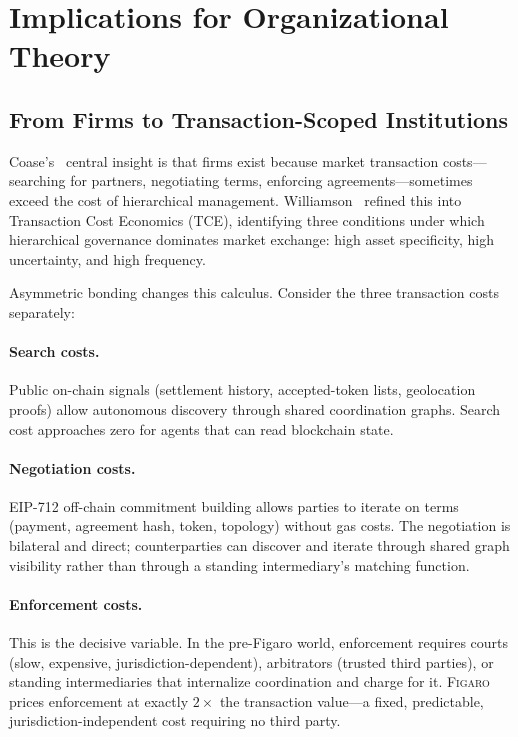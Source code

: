 \documentclass[11pt,a4paper]{article}
\theoremstyle{definition}
\theoremstyle{remark}
\newcommand{\figaro}{\textsc{Figaro}}
\begin{document}
\section{Implications for Organizational Theory}
\label{sec:post-firm}

\subsection{From Firms to Transaction-Scoped Institutions}

Coase's~\citeyearpar{coase1937} central insight is that firms exist
because market transaction costs---searching for partners, negotiating
terms, enforcing agreements---sometimes exceed the cost of hierarchical
management. Williamson~\citeyearpar{williamson1985} refined this into
Transaction Cost Economics (TCE), identifying three conditions under
which hierarchical governance dominates market exchange: high asset
specificity, high uncertainty, and high frequency.

Asymmetric bonding changes this calculus. Consider the three transaction
costs separately:

\paragraph{Search costs.}
Public on-chain signals (settlement history, accepted-token lists,
geolocation proofs) allow autonomous discovery through shared
coordination graphs. Search cost approaches zero for agents that can
read blockchain state.

\paragraph{Negotiation costs.}
EIP-712 off-chain commitment building allows parties to iterate on terms
(payment, agreement hash, token, topology) without gas costs. The
negotiation is bilateral and direct; counterparties can discover and
iterate through shared graph visibility rather than through a standing
intermediary's matching function.

\paragraph{Enforcement costs.}
This is the decisive variable. In the pre-Figaro world, enforcement
requires courts (slow, expensive, jurisdiction-dependent), arbitrators
(trusted third parties), or standing intermediaries that internalize
coordination and charge for it. \figaro{} prices enforcement at exactly
$2\times$ the transaction value---a fixed, predictable,
jurisdiction-independent cost requiring no third party.
\end{document}
